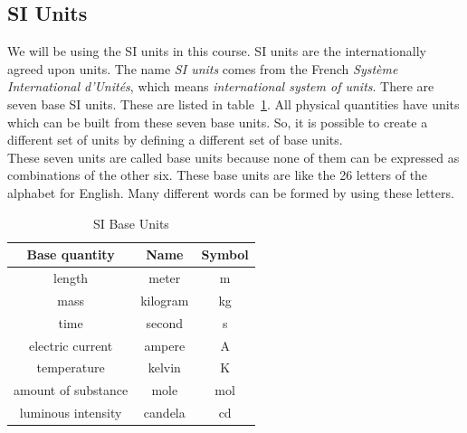 \subsection*{SI Units}
            \nopagebreak
We will be using the SI units in this course. SI units are the internationally agreed upon units. 
  { The name \textsl{SI units} comes from the French \textsl{Syst\`{e}me International d'Unit\'{e}s}, which means \textsl{international system of units}.  } 
There are seven base SI units. These are listed in table~\ref{tab:units:SIunits}. All physical quantities have units which can be built from these seven base units. So, it is possible to create a different set of units by defining a different set of base units.\\
These seven units are called base units because none of them can be expressed as combinations of the other six. These base units are like the 26 letters of the alphabet for English. Many different words can be formed by using these letters.\par 
\begin{table}[H]
\centering
\begin{tabular}{|c|c|c|}\hline
\textbf{Base quantity} & \textbf{Name} & \textbf{Symbol} \\
\hline length & meter & m\\ \hline 
mass & kilogram & kg\\ \hline 
time & second & s\\ \hline 
electric current & ampere& A\\ \hline temperature & kelvin & K\\ \hline 
amount of substance & mole & mol\\ \hline 
luminous intensity & candela & cd\\ \hline
\end{tabular}
\caption{SI Base Units}\label{tab:units:SIunits}
\end{table}
